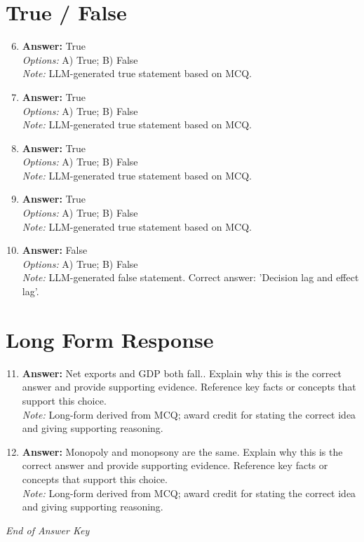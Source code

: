 \documentclass[12pt]{article}
\begin{document}
\section*{True / False}
\begin{enumerate}[label=\arabic*.]
\setcounter{enumi}{5}
\item \textbf{Answer:} True
\\ \textit{Options:} A) True; B) False
\\ \textit{Note:} LLM-generated true statement based on MCQ.
\item \textbf{Answer:} True
\\ \textit{Options:} A) True; B) False
\\ \textit{Note:} LLM-generated true statement based on MCQ.
\item \textbf{Answer:} True
\\ \textit{Options:} A) True; B) False
\\ \textit{Note:} LLM-generated true statement based on MCQ.
\item \textbf{Answer:} True
\\ \textit{Options:} A) True; B) False
\\ \textit{Note:} LLM-generated true statement based on MCQ.
\item \textbf{Answer:} False
\\ \textit{Options:} A) True; B) False
\\ \textit{Note:} LLM-generated false statement. Correct answer: 'Decision lag and effect lag'.
\end{enumerate}

\section*{Long Form Response}
\begin{enumerate}[label=\arabic*.]
\setcounter{enumi}{10}
\item \textbf{Answer:} Net exports and GDP both fall.. Explain why this is the correct answer and provide supporting evidence. Reference key facts or concepts that support this choice.
\\ \textit{Note:} Long-form derived from MCQ; award credit for stating the correct idea and giving supporting reasoning.
\item \textbf{Answer:} Monopoly and monopsony are the same. Explain why this is the correct answer and provide supporting evidence. Reference key facts or concepts that support this choice.
\\ \textit{Note:} Long-form derived from MCQ; award credit for stating the correct idea and giving supporting reasoning.
\end{enumerate}

\vfill
\noindent\textit{End of Answer Key}
\end{document}
